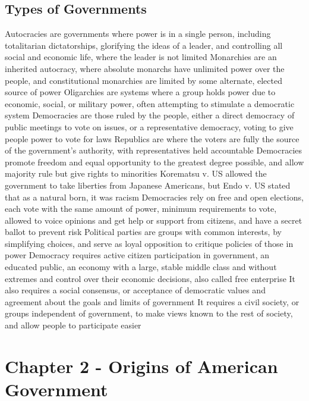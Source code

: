 \documentclass[11 pt, twoside]{article}
\newenvironment{outline*}
{
	\begin{outline}[enumerate]
	}
	{\end{outline}
}
\begin{document}
\subsection{Types of Governments}
\begin{outline*}
\1 Autocracies are governments where power is in a single person, including totalitarian dictatorships, glorifying the ideas of a leader, and controlling all social and economic life, where the leader is not limited
\2 Monarchies are an inherited autocracy, where absolute monarchs have unlimited power over the people, and constitutional monarchies are limited by some alternate, elected source of power
\1 Oligarchies are systems where a group holds power due to economic, social, or military power, often attempting to stimulate a democratic system
\1 Democracies are those ruled by the people, either a direct democracy of public meetings to vote on issues, or a representative democracy, voting to give people power to vote for laws
\2 Republics are where the voters are fully the source of the government’s authority, with representatives held accountable
\2 Democracies promote freedom and equal opportunity to the greatest degree possible, and allow majority rule but give rights to minorities
\2 Korematsu v. US allowed the government to take liberties from Japanese Americans, but Endo v. US stated that as a natural born, it was racism
\1 Democracies rely on free and open elections, each vote with the same amount of power, minimum requirements to vote, allowed to voice opinions and get help or support from citizens, and have a secret ballot to prevent risk
\2 Political parties are groups with common interests, by simplifying choices, and serve as loyal opposition to critique policies of those in power
\1 Democracy requires active citizen participation in government, an educated public, an economy with a large, stable middle class and without extremes and control over their economic decisions, also called free enterprise
\2 It also requires a social consensus, or acceptance of democratic values and agreement about the goals and limits of government
\2 It requires a civil society, or groups independent of government, to make views known to the rest of society, and allow people to participate easier
\end{outline*}
\section{Chapter 2 - Origins of American Government}
\end{document}
